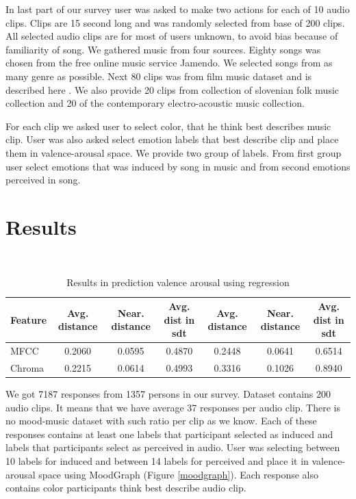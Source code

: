 \documentclass[a4paper]{article}
\begin{document}
In last part of our survey user was asked to make two actions for each of 10 audio clips. Clips are 15 second long and was randomly selected from base of 200 clips. All selected audio clips are for most of users unknown, to avoid bias because of familiarity of song. We gathered music from four sources. Eighty songs was chosen from the free online music service Jamendo. We selected songs from as many genre as possible. Next 80 clips was from film music dataset and is described here \cite{eerola2010comparison}. We also provide 20 clips from collection of slovenian folk music collection and 20 of the contemporary electro-acoustic music collection. 

For each clip we asked user to select color, that he think best describes music clip. User was also asked select emotion labels that best describe clip and place them in valence-arousal space. We provide two group of labels. From first group user select emotions that was induced by song in music and from second emotions perceived in song.

\section{Results}

\begin{table}[t]
\caption{Results in prediction valence arousal using regression}
\\
\begin{tabular}{| l | c | c | c | c | c | c |}
\hline
Feature & Avg. distance & Near. distance & Avg. dist in sdt & Avg. distance & Near. distance & Avg. dist in sdt \\
\hline
MFCC & 0.2060 & 0.0595 & 0.4870 & 0.2448 & 0.0641 & 0.6514\\
Chroma & 0.2215 & 0.0614 & 0.4993 & 0.3316 & 0.1026 & 0.8940\\
\hline
\end{tabular}
\label{regressionresults}
\end{table}

We got 7187 responses from 1357 persons in our survey. Dataset contains 200 audio clips. It means that we have average 37 responses per audio clip. There is no mood-music dataset with such ratio per clip as we know. Each of these responses contains at least one labels that participant selected as induced and labels that participants select as perceived in audio. User was selecting between 10 labels for induced and between 14 labels for perceived and place it in valence-arousal space using MoodGraph (Figure \ref{moodgraph}). Each response also contains color participants think best describe audio clip. 
\end{document}
